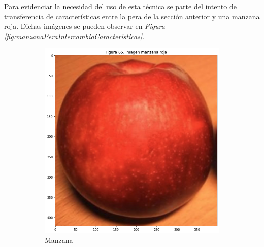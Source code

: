 \documentclass[11pt,twoside,titlepage,a4paper]{article}
\numberwithin{equation}{section} %
\theoremstyle{usual}
\begin{document}
Para evidenciar la necesidad del uso de esta técnica se parte del intento de transferencia de características entre la pera de la sección anterior y una manzana roja. Dichas imágenes se pueden observar en \textit{Figura \ref{fig:manzanaPeraIntercambioCaracteristicas}}.

\begin{figure}[h]
    \centering
    \begin{subfigure}[t]{.33\textwidth}
        \centering
        \includegraphics[width=\textwidth]{imagenes/PoissonImageEditing_cell_77_output_0.png}
        \caption{Manzana}
        \label{fig:manzanaIntercambioColor}
    \end{subfigure}
    \centering
    \begin{subfigure}[t]{.33\textwidth}
        \centering

\end{subfigure}
\end{figure}
\end{document}
